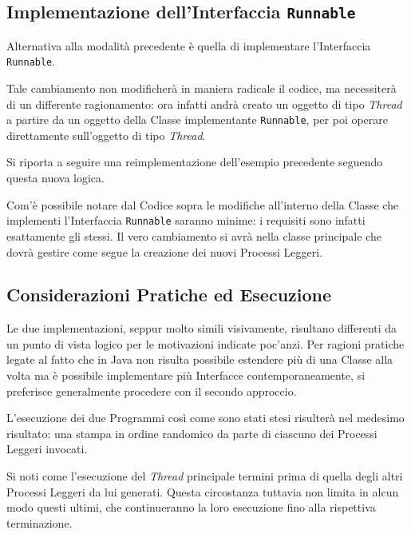 \subsection{Implementazione dell'Interfaccia \texttt{Runnable}}
Alternativa alla modalità precedente è quella di implementare l'Interfaccia \texttt{Runnable}\cite{Runnable_JavaDocs}. \par
Tale cambiamento non modificherà in maniera radicale il codice, ma necessiterà di un differente ragionamento: ora infatti andrà creato un oggetto di tipo \textit{Thread} a partire da un oggetto della Classe implementante \texttt{Runnable}, per poi operare direttamente sull'oggetto di tipo \textit{Thread}. \par
Si riporta a seguire una reimplementazione dell'esempio precedente seguendo questa nuova logica.

Com'è possibile notare dal Codice sopra le modifiche all'interno della Classe che implementi l'Interfaccia \texttt{Runnable} saranno minime: i requisiti sono infatti esattamente gli stessi. Il vero cambiamento si avrà nella classe principale che dovrà gestire come segue la creazione dei nuovi Processi Leggeri.

\subsection{Considerazioni Pratiche ed Esecuzione}
Le due implementazioni, seppur molto simili visivamente, risultano differenti da un punto di vista logico per le motivazioni indicate poc'anzi. Per ragioni pratiche legate al fatto che in Java non risulta possibile estendere più di una Classe alla volta ma è possibile implementare più Interfacce contemporaneamente, si preferisce generalmente procedere con il secondo approccio. \par
L'esecuzione dei due Programmi così come sono stati stesi risulterà nel medesimo risultato: una stampa in ordine randomico da parte di ciascuno dei Processi Leggeri invocati.

Si noti come l'esecuzione del \textit{Thread} principale termini prima di quella degli altri Processi Leggeri da lui generati. Questa circostanza tuttavia non limita in alcun modo questi ultimi, che continueranno la loro esecuzione fino alla rispettiva terminazione.

